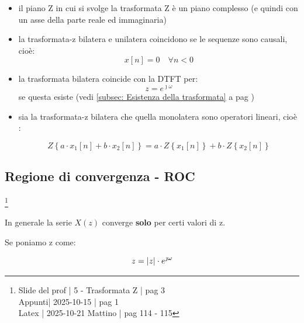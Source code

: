 \begin{itemize}
    \item il piano Z in cui si svolge la trasformata Z è un piano complesso (e quindi con un asse della parte reale ed immaginaria) 
    \item la trasformata-z bilatera e unilatera coincidono se le sequenze sono causali, cioè: 
    {
        \Large 
        \begin{equation}
     x \left[ n\right] = 0 \quad \forall n < 0        
        \end{equation}
    }
    
    \item la trasformata bilatera coincide con la DTFT per: 
    {
        \Large 
        \begin{equation}
     z = e^{\jmath \omega}       
        \end{equation}
    } 
    se questa esiste (vedi \ref{subsec: Esistenza della trasformata}  a pag \pageref{subsec: Esistenza della trasformata}) 
    \item sia la trasformata-z bilatera che quella monolatera sono operatori lineari, cioè :
    
    {
        \Large 
        \begin{equation}
       Z \left\{a \cdot x_1 \left[ n\right] + b \cdot x_2 \left[ n\right]\right\} 
       = 
       a \cdot Z \left\{ x_1 \left[ n\right]\right\} + b \cdot Z \left\{ x_2 \left[ n\right]\right\}     
        \end{equation}
    } 
\end{itemize}

\newpage 

\subsection{Regione di convergenza - ROC}

\footnote{ 
    Slide del prof | 5 - Trasformata Z | pag 3\\
    Appunti| 2025-10-15 | pag 1 \\ 
    Latex | 2025-10-21 Mattino | pag 114 - 115
}

In generale la serie $X \left(z \right)$ converge \textbf{solo} per certi valori di z. \newline 

Se poniamo z come: 

{
    \Large 
    \begin{equation}
        z = \abs{z} \cdot e^{\jmath \omega}
    \end{equation}
} 

